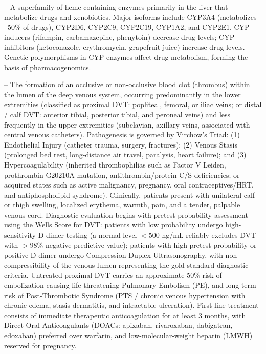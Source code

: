 -- A superfamily of heme-containing enzymes primarily in the liver that metabolize drugs and xenobiotics. Major isoforms include CYP3A4 (metabolizes ~50\% of drugs), CYP2D6, CYP2C9, CYP2C19, CYP1A2, and CYP2E1. CYP inducers (rifampin, carbamazepine, phenytoin) decrease drug levels; CYP inhibitors (ketoconazole, erythromycin, grapefruit juice) increase drug levels. Genetic polymorphisms in CYP enzymes affect drug metabolism, forming the basis of pharmacogenomics.

-- The formation of an occlusive or non-occlusive blood clot (thrombus) within the lumen of the deep venous system, occurring predominantly in the lower extremities (classified as proximal DVT: popliteal, femoral, or iliac veins; or distal / calf DVT: anterior tibial, posterior tibial, and peroneal veins) and less frequently in the upper extremities (subclavian, axillary veins, associated with central venous catheters). Pathogenesis is governed by Virchow's Triad: (1) Endothelial Injury (catheter trauma, surgery, fractures); (2) Venous Stasis (prolonged bed rest, long-distance air travel, paralysis, heart failure); and (3) Hypercoagulability (inherited thrombophilias such as Factor V Leiden, prothrombin G20210A mutation, antithrombin/protein C/S deficiencies; or acquired states such as active malignancy, pregnancy, oral contraceptives/HRT, and antiphospholipid syndrome). Clinically, patients present with unilateral calf or thigh swelling, localized erythema, warmth, pain, and a tender, palpable venous cord. Diagnostic evaluation begins with pretest probability assessment using the Wells Score for DVT: patients with low probability undergo high-sensitivity D-dimer testing (a normal level $<500$ ng/mL reliably excludes DVT with $>98\%$ negative predictive value); patients with high pretest probability or positive D-dimer undergo Compression Duplex Ultrasonography, with non-compressibility of the venous lumen representing the gold-standard diagnostic criteria. Untreated proximal DVT carries an approximate 50\% risk of embolization causing life-threatening Pulmonary Embolism (PE), and long-term risk of Post-Thrombotic Syndrome (PTS / chronic venous hypertension with chronic edema, stasis dermatitis, and intractable ulceration). First-line treatment consists of immediate therapeutic anticoagulation for at least 3 months, with Direct Oral Anticoagulants (DOACs: apixaban, rivaroxaban, dabigatran, edoxaban) preferred over warfarin, and low-molecular-weight heparin (LMWH) reserved for pregnancy.

